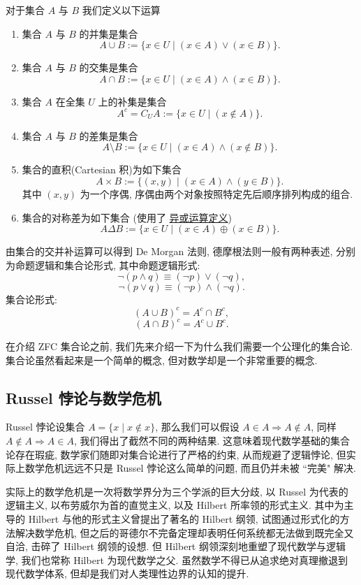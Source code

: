 \documentclass[cn,toc=twocol]{elegantbook}
\newcommand{\ITEMS}{\begin{enumerate}}
\newcommand{\ITEME}{\end{enumerate}}
\begin{document}
对于集合 $A$ 与 $B$ 我们定义以下运算
\ITEMS
	\item 集合 $A$ 与 $B$ 的并集是集合
	\[
		A\cup B := \{x\in U\mid (x\in A) \vee (x\in B)\}.
	\]
	\item 集合 $A$ 与 $B$ 的交集是集合
	\[
		A\cap B := \{x\in U\mid (x\in A) \land (x\in B)\}.
	\]
	\item 集合 $A$ 在全集 $U$ 上的补集是集合
	\[
		A^c = C_U A := \{x\in U\mid (x\notin A) \}.
	\]
	\item 集合 $A$ 与 $B$ 的差集是集合
	\[
		A\setminus B := \{x\in U\mid (x\in A) \land (x\notin B)\}.
	\]
	\item 集合的直积(Cartesian 积)为如下集合
	\[
		A \times B :=\{(x, y)\mid (x \in A)\land(y \in B)\}.
	\]
	其中 $(x, y)$ 为一个序偶, 序偶由两个对象按照特定先后顺序排列构成的组合.
	\item 集合的对称差为如下集合 (使用了 \hyperref[def:eor]{异或运算定义})
	\[
		A \Delta B := \{x\in U\mid (x \in A) \oplus (x \in B)\}.
	\]
\ITEME


由集合的交并补运算可以得到 De Morgan 法则, 德摩根法则一般有两种表述, 分别为命题逻辑和集合论形式, 其中命题逻辑形式:
	\[
		\neg (p\land q)\equiv (\neg p)\lor (\neg q),
	\]
	\[
		\neg (p\lor q)\equiv (\neg p)\land (\neg q).
	\]
集合论形式:
	\[
		(A\cup B)^c = A^c\cap B^c,
	\]
	\[
		(A\cap B)^c = A^c\cup B^c.
	\]

在介绍 ZFC 集合论之前, 我们先来介绍一下为什么我们需要一个公理化的集合论. 集合论虽然看起来是一个简单的概念, 但对数学却是一个非常重要的概念.


\subsection{Russel 悖论与数学危机}

Russel 悖论设集合 $A=\{x\mid x \notin x\}$, 那么我们可以假设 $A\in A\Rightarrow A\notin A$, 同样 $A\notin A \Rightarrow A\in A$, 我们得出了截然不同的两种结果. 这意味着现代数学基础的集合论存在瑕疵, 数学家们随即对集合论进行了严格的约束, 从而规避了逻辑悖论, 但实际上数学危机远远不只是 Russel 悖论这么简单的问题, 而且仍并未被 ``完美" 解决. 

实际上的数学危机是一次将数学界分为三个学派的巨大分歧, 以 Russel 为代表的逻辑主义, 以布劳威尔为首的直觉主义, 以及 Hilbert 所率领的形式主义. 其中为主导的 Hilbert 与他的形式主义曾提出了著名的 Hilbert 纲领, 试图通过形式化的方法解决数学危机, 但之后的哥德尔不完备定理却表明任何系统都无法做到既完全又自洽, 击碎了 Hilbert 纲领的设想. 但 Hilbert 纲领深刻地重塑了现代数学与逻辑学, 我们也常称 Hilbert 为现代数学之父. 虽然数学不得已从追求绝对真理撤退到现代数学体系, 但却是我们对人类理性边界的认知的提升. 
\end{document}
